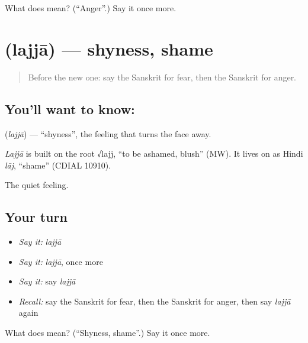 \begin{tcolorbox}[breakable,colback=teal!4,colframe=teal!35!black,title={Before you move on}]
What does  mean? (\textquotedblleft{}Anger\textquotedblright{}.) Say it once more.
\end{tcolorbox}
\section[\texorpdfstring{\sk{लज्जा} (lajjā)}{लज्जा (lajjā)}]{ (lajjā) — shyness, shame}

\label{lesson:SA-C68-shyness}



\begin{quote}
Before the new one: say the Sanskrit for fear, then the Sanskrit for anger.
\end{quote}

\subsection*{You'll want to know: }
\textbf{} (\emph{lajjā}) — \textquotedblleft{}shyness\textquotedblright{}, the feeling that turns the face away.

\begin{cousinweb}
\emph{Lajjā} is built on the root √lajj, \textquotedblleft{}to be ashamed, blush\textquotedblright{} (MW). It lives on as Hindi \emph{lāj}, \textquotedblleft{}shame\textquotedblright{} (CDIAL 10910).
\end{cousinweb}

\begin{grammarlens}[title={What you've built}]
The quiet feeling.
\end{grammarlens}

\subsection*{Your turn}
\begin{itemize}
\raggedright
  \item \emph{Say it:} \emph{lajjā}
  \item \emph{Say it:} \emph{lajjā}, once more
  \item \emph{Say it:} say \emph{lajjā}
  \item \emph{Recall:} say the Sanskrit for fear, then the Sanskrit for anger, then say \emph{lajjā} again
\end{itemize}

\begin{tcolorbox}[breakable,colback=teal!4,colframe=teal!35!black,title={Before you move on}]
What does  mean? (\textquotedblleft{}Shyness, shame\textquotedblright{}.) Say it once more.
\end{tcolorbox}
